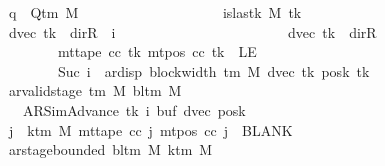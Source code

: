 \begin{isabellebody}
\ \ \ \ \ \ \ \ \ \ \ \ \ \ \ \ \ \ \ q\ {\isasymin}\ Q{\isacharunderscore}{\kern0pt}tm\ M{\isacharsemicolon}{\kern0pt}\isanewline
\ \ \ \ \ \ \ \ \ \ \ \ \ \ \ \ \ \ \ {\isasymnot}\ is{\isacharunderscore}{\kern0pt}last{\isacharunderscore}{\kern0pt}k\ M\ tk{\isacharsemicolon}{\kern0pt}\isanewline
\ \ \ \ \ \ \ \ \ \ \ \ \ \ \ \ \ \ \ {\isacharparenleft}{\kern0pt}dvec\ tk\ {\isacharequal}{\kern0pt}\ dir{\isachardot}{\kern0pt}R\ {\isasymand}\ i\ {\isacharequal}{\kern0pt}\ {}{\isacharparenright}{\kern0pt}\isanewline
\ \ \ \ \ \ \ \ \ \ \ \ \ \ \ \ \ \ \ \ \ {\isasymor}\ {\isacharparenleft}{\kern0pt}dvec\ tk\ {\isasymnoteq}\ dir{\isachardot}{\kern0pt}R\isanewline
\ \ \ \ \ \ \ \ \ \ \ \ \ \ \ \ \ \ \ \ \ \ \ \ \ {\isasymand}\ mt{\isacharunderscore}{\kern0pt}tape\ cc\ tk\ {\isacharparenleft}{\kern0pt}mt{\isacharunderscore}{\kern0pt}pos\ cc\ tk{\isacharparenright}{\kern0pt}\ {\isasymnoteq}\ LE{}\isanewline
\ \ \ \ \ \ \ \ \ \ \ \ \ \ \ \ \ \ \ \ \ \ \ \ \ {\isasymand}\ Suc\ i\ {\isacharequal}{\kern0pt}\ ar{\isacharunderscore}{\kern0pt}disp\ {\isacharparenleft}{\kern0pt}block{\isacharunderscore}{\kern0pt}width\ {\isacharparenleft}{\kern0pt}{\isasymGamma}{\isacharunderscore}{\kern0pt}tm\ M{\isacharparenright}{\kern0pt}{\isacharparenright}{\kern0pt}\ {\isacharparenleft}{\kern0pt}dvec\ tk{\isacharparenright}{\kern0pt}\ {\isacharparenleft}{\kern0pt}posk\ tk{\isacharparenright}{\kern0pt}{\isacharparenright}{\kern0pt}{\isacharsemicolon}{\kern0pt}\isanewline
\ \ \ \ \ \ \ \ \ \ \ \ \ \ \ \ \ \ \ ar{\isacharunderscore}{\kern0pt}valid{\isacharunderscore}{\kern0pt}stage\ {\isacharparenleft}{\kern0pt}{\isasymGamma}{\isacharunderscore}{\kern0pt}tm\ M{\isacharparenright}{\kern0pt}\ {\isacharparenleft}{\kern0pt}bl{\isacharunderscore}{\kern0pt}tm\ M{\isacharparenright}{\kern0pt}\isanewline
\ \ \ \ \ \ \ \ \ \ \ \ \ \ \ \ \ \ \ \ \ {\isacharparenleft}{\kern0pt}AR{\isacharunderscore}{\kern0pt}SimAdvance{\isacharcomma}{\kern0pt}\ tk{\isacharcomma}{\kern0pt}\ i{\isacharcomma}{\kern0pt}\ buf{\isacharcomma}{\kern0pt}\ dvec{\isacharcomma}{\kern0pt}\ posk{\isacharparenright}{\kern0pt}{\isacharsemicolon}{\kern0pt}\isanewline
\ \ \ \ \ \ \ \ \ \ \ \ \ \ \ \ \ \ \ {\isasymforall}j\ {\isasymge}\ k{\isacharunderscore}{\kern0pt}tm\ M{\isachardot}{\kern0pt}\ mt{\isacharunderscore}{\kern0pt}tape\ cc\ j\ {\isacharparenleft}{\kern0pt}mt{\isacharunderscore}{\kern0pt}pos\ cc\ j{\isacharparenright}{\kern0pt}\ {\isacharequal}{\kern0pt}\ BLANK{}{\isacharsemicolon}{\kern0pt}\isanewline
\ \ \ \ \ \ \ \ \ \ \ \ \ \ \ \ \ \ \ ar{\isacharunderscore}{\kern0pt}stage{\isacharunderscore}{\kern0pt}bounded\ {\isacharparenleft}{\kern0pt}bl{\isacharunderscore}{\kern0pt}tm\ M{\isacharparenright}{\kern0pt}\ {\isacharparenleft}{\kern0pt}k{\isacharunderscore}{\kern0pt}tm\ M{\isacharparenright}{\kern0pt}\isanewline

\end{isabellebody}
